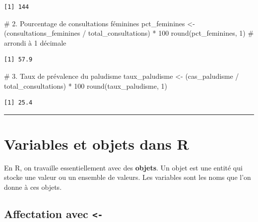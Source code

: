 \documentclass[
  french,
  11pt,
  a4paper,
]{article}
\newenvironment{Shaded}{}{}
\newcommand{\CommentTok}[1]{\textcolor[rgb]{0.42,0.45,0.49}{#1}}
\newcommand{\DecValTok}[1]{\textcolor[rgb]{0.00,0.36,0.77}{#1}}
\newcommand{\FunctionTok}[1]{\textcolor[rgb]{0.44,0.26,0.76}{#1}}
\newcommand{\NormalTok}[1]{\textcolor[rgb]{0.14,0.16,0.18}{#1}}
\newcommand{\OtherTok}[1]{\textcolor[rgb]{0.44,0.26,0.76}{#1}}
\newcommand{\SpecialCharTok}[1]{\textcolor[rgb]{0.00,0.36,0.77}{#1}}
\begin{document}
\begin{verbatim}
[1] 144
\end{verbatim}

\begin{Shaded}
\begin{Highlighting}[]
\CommentTok{\# 2. Pourcentage de consultations féminines}
\NormalTok{pct\_feminines }\OtherTok{\textless{}{-}}\NormalTok{ (consultations\_feminines }\SpecialCharTok{/}\NormalTok{ total\_consultations) }\SpecialCharTok{*} \DecValTok{100}
\FunctionTok{round}\NormalTok{(pct\_feminines, }\DecValTok{1}\NormalTok{)  }\CommentTok{\# arrondi à 1 décimale}
\end{Highlighting}
\end{Shaded}

\begin{verbatim}
[1] 57.9
\end{verbatim}

\begin{Shaded}
\begin{Highlighting}[]
\CommentTok{\# 3. Taux de prévalence du paludisme}
\NormalTok{taux\_paludisme }\OtherTok{\textless{}{-}}\NormalTok{ (cas\_paludisme }\SpecialCharTok{/}\NormalTok{ total\_consultations) }\SpecialCharTok{*} \DecValTok{100}
\FunctionTok{round}\NormalTok{(taux\_paludisme, }\DecValTok{1}\NormalTok{)}
\end{Highlighting}
\end{Shaded}

\begin{verbatim}
[1] 25.4
\end{verbatim}

\begin{center}\rule{0.5\linewidth}{0.5pt}\end{center}

\section{Variables et objets dans R}\label{variables-et-objets-dans-r}

En R, on travaille essentiellement avec des \textbf{objets}. Un objet
est une entité qui stocke une valeur ou un ensemble de valeurs. Les
variables sont les noms que l'on donne à ces objets.

\subsection{\texorpdfstring{Affectation avec
\texttt{\textless{}-}}{Affectation avec \textless-}}\label{affectation-avec--}
\end{document}
